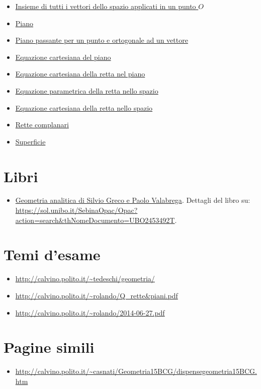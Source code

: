 \documentclass[a4paper,10pt]{article}
\begin{document}
\begin{itemize}
   \item \href{./InsiemeVettoriApplicati.html}{Insieme di tutti i vettori dello spazio applicati in un punto $O$}
   \item \href{./Piano.html}{Piano}
   \item \href{./PianoPassantePunto.html}{Piano passante per un punto e ortogonale ad un vettore}
   \item \href{./EquazioneCartesianaPiano.html}{Equazione cartesiana del piano}
   \item \href{./EquazioneCartesianaRettaPiano.html}{Equazione cartesiana della retta nel piano}
   \item \href{./EquazioneParametricaRettaSpazio.html}{Equazione parametrica della retta nello spazio}
   \item \href{./EquazioneCartesianaRetta.html}{Equazione cartesiana della retta nello spazio}
   \item \href{./RetteComplanari.html}{Rette complanari}
   \item \href{./Superficie.html}{Superficie}
  \end{itemize}
  
\section{Libri}
  \begin{itemize}
   \item \href{./libro001.html}{Geometria analitica di Silvio Greco e Paolo Valabrega}. Dettagli del libro su: \url{https://sol.unibo.it/SebinaOpac/Opac?action=search&thNomeDocumento=UBO2453492T}.
  \end{itemize}

\section{Temi d'esame}
  \begin{itemize}
   \item \url{http://calvino.polito.it/~tedeschi/geometria/}
   \item \url{http://calvino.polito.it/~rolando/Q_rette&piani.pdf}
   \item \url{http://calvino.polito.it/~rolando/2014-06-27.pdf}
  \end{itemize}

\section{Pagine simili}
\begin{itemize}
  \item \url{http://calvino.polito.it/~casnati/Geometria15BCG/dispensegeometria15BCG.htm}
\end{itemize}
\end{document}
